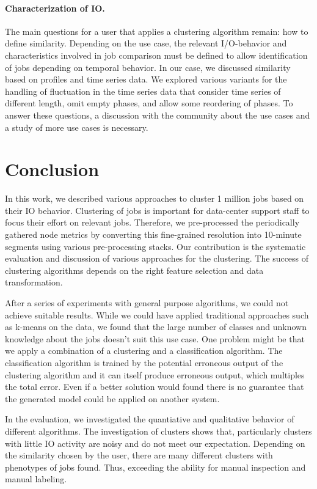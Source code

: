 \documentclass{jhps}
\begin{document}
{{{{\paragraph{Characterization of IO.}
The main questions for a user that applies a clustering algorithm remain: how to define similarity.
Depending on the use case, the relevant I/O-behavior and characteristics involved in job comparison must be defined to allow identification of jobs depending on temporal behavior.
In our case, we discussed similarity based on profiles and time series data.
We explored various variants for the handling of fluctuation in the time series data that consider time series of different length, omit empty phases, and allow some reordering of phases.
To answer these questions, a discussion with the community about the use cases and a study of more use cases is necessary.


\section{Conclusion}

In this work, we described various approaches to cluster 1 million jobs based on their IO behavior.
Clustering of jobs is important for data-center support staff to focus their effort on relevant jobs.
Therefore, we pre-processed the periodically gathered node metrics by converting this fine-grained resolution into 10-minute segments using various pre-processing stacks.
Our contribution is the systematic evaluation and discussion of various approaches for the clustering.
The success of clustering algorithms depends on the right feature selection and data transformation.

After a series of experiments with general purpose algorithms, we could not achieve suitable results.
While we could have applied traditional approaches such as k-means on the data, we found that the large number of classes and unknown knowledge about the jobs doesn't suit this use case.
One problem might be that we apply a combination of a clustering and a classification algorithm.
The classification algorithm is trained by the potential erroneous output of the clustering algorithm and it can itself produce erroneous output, which multiples the total error.
Even if a better solution would found there is no guarantee that the generated model could be applied on another system.

In the evaluation, we investigated the quantiative and qualitative behavior of different algorithms.
The investigation of clusters shows that, particularly clusters with little IO activity are noisy and do not meet our expectation.
Depending on the similarity chosen by the user, there are many different clusters with phenotypes of jobs found.
Thus, exceeding the ability for manual inspection and manual labeling.

}}}}
\end{document}
